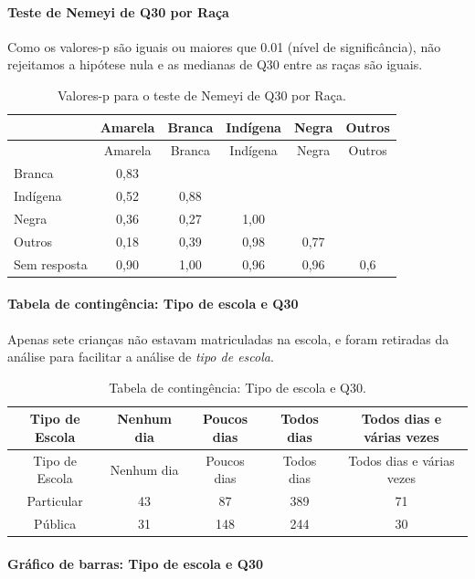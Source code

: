 \documentclass[]{article}
\let\oldparagraph\paragraph
\renewcommand{\paragraph}[1]{\oldparagraph{#1}\mbox{}}
\begin{document}
\hypertarget{teste-de-nemeyi-de-q30-por-rauxe7a}{%
\paragraph{Teste de Nemeyi de Q30 por Raça}\label{teste-de-nemeyi-de-q30-por-rauxe7a}}

Como os valores-p são iguais ou maiores que 0.01 (nível de significância), não rejeitamos a hipótese nula e as medianas de Q30 entre as raças são iguais.

\begin{longtable}[]{@{}lccccc@{}}
\caption{\label{tab:unnamed-chunk-996}Valores-p para o teste de Nemeyi de Q30 por Raça.}\tabularnewline
\toprule
& Amarela & Branca & Indígena & Negra & Outros\tabularnewline
\midrule
\endfirsthead
\toprule
& Amarela & Branca & Indígena & Negra & Outros\tabularnewline
\midrule
\endhead
Branca & 0,83 & & & &\tabularnewline
Indígena & 0,52 & 0,88 & & &\tabularnewline
Negra & 0,36 & 0,27 & 1,00 & &\tabularnewline
Outros & 0,18 & 0,39 & 0,98 & 0,77 &\tabularnewline
Sem resposta & 0,90 & 1,00 & 0,96 & 0,96 & 0,6\tabularnewline
\bottomrule
\end{longtable}

\cleardoublepage

\hypertarget{tabela-de-continguxeancia-tipo-de-escola-e-q30}{%
\paragraph{Tabela de contingência: Tipo de escola e Q30}\label{tabela-de-continguxeancia-tipo-de-escola-e-q30}}

Apenas sete crianças não estavam matriculadas na escola, e foram retiradas da análise para facilitar a análise de \emph{tipo de escola}.

\begin{longtable}[]{@{}ccccc@{}}
\caption{\label{tab:unnamed-chunk-997}Tabela de contingência: Tipo de escola e Q30.}\tabularnewline
\toprule
Tipo de Escola & Nenhum dia & Poucos dias & Todos dias & Todos dias e várias vezes\tabularnewline
\midrule
\endfirsthead
\toprule
Tipo de Escola & Nenhum dia & Poucos dias & Todos dias & Todos dias e várias vezes\tabularnewline
\midrule
\endhead
Particular & 43 & 87 & 389 & 71\tabularnewline
Pública & 31 & 148 & 244 & 30\tabularnewline
\bottomrule
\end{longtable}

\hypertarget{gruxe1fico-de-barras-tipo-de-escola-e-q30}{%
\paragraph{Gráfico de barras: Tipo de escola e Q30}\label{gruxe1fico-de-barras-tipo-de-escola-e-q30}}
\end{document}
